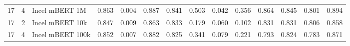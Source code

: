 \begin{tabular}{rrlrrrrrrrrrrr}
 17 &      4 &      Incel mBERT 1M &                 0.863 &          0.004 &                  0.887 &                   0.841 &                 0.503 &           0.042 &                  0.356 &                   0.864 &                  0.845 &                    0.801 &                   0.894 \\
 17 &      2 &     Incel mBERT 10k &                 0.847 &          0.009 &                  0.863 &                   0.833 &                 0.179 &           0.060 &                  0.102 &                   0.831 &                  0.831 &                    0.806 &                   0.858 \\
 17 &      4 &    Incel mBERT 100k &                 0.852 &          0.007 &                  0.882 &                   0.825 &                 0.341 &           0.079 &                  0.221 &                   0.793 &                  0.824 &                    0.783 &                   0.871 \\
\bottomrule
\end{tabular}

